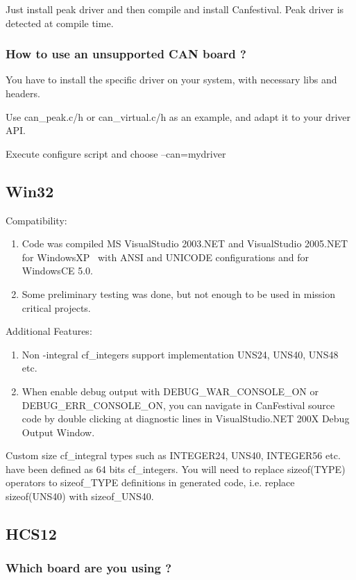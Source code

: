 \documentclass[12pt,english,a4paper]{book}
\begin{document}
Just install peak driver and then compile and install Canfestival.
Peak driver is detected at compile time.


\subsubsection{How to use an unsupported CAN board ?}

You have to install the specific driver on your system, with necessary
libs and headers.

Use can\_peak.c/h or can\_virtual.c/h as an example, and adapt it
to your driver API.

Execute configure script and choose --can=mydriver


\subsection{Win32}

Compatibility:

\begin{enumerate}
\item Code was compiled MS VisualStudio 2003.NET and VisualStudio 2005.NET
for WindowsXP \ with ANSI and UNICODE configurations and for WindowsCE
5.0. 
\item Some preliminary testing was done, but not enough to be used in mission
critical projects. 
\end{enumerate}
Additional Features:

\begin{enumerate}
\item Non -integral cf_integers support implementation UNS24, UNS40, UNS48
etc. 
\item When enable debug output with DEBUG\_WAR\_CONSOLE\_ON or DEBUG\_ERR\_CONSOLE\_ON,
you can navigate in CanFestival source code by double clicking at
diagnostic lines in VisualStudio.NET 200X Debug Output Window. 
\end{enumerate}
Custom size cf_integral types such as INTEGER24, UNS40, INTEGER56 etc.
have been defined as 64 bits cf_integers. You will need to replace sizeof(TYPE)
operators to sizeof\_TYPE definitions in generated code, i.e. replace
sizeof(UNS40) with sizeof\_UNS40.


\subsection{HCS12}


\subsubsection{Which board are you using ?}
\end{document}
